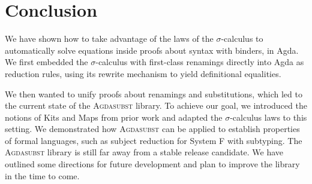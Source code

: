 \documentclass[screen,nonacm]{acmart}
\begin{document}
\section{Conclusion}\label{sec:con}
We have shown how to take advantage of the laws of the $\sigma$-calculus to
automatically solve equations inside proofs about syntax with binders, in Agda. 
We first embedded the $\sigma$-calculus with
first-class renamings directly into Agda as reduction rules, using its rewrite
mechanism to yield definitional equalities.

We then wanted to unify proofs about renamings and substitutions, which led to
the current state of the \textsc{Agdasubst} library. To achieve our goal, we
introduced the notions of Kits and Maps from prior work and adapted the
$\sigma$-calculus laws to this setting. We demonstrated how \textsc{Agdasubst}
can be applied to establish properties of formal languages, such as subject
reduction for System F with subtyping. The \textsc{Agdasubst} library is still
far away from a stable release candidate. We have outlined some directions for
future development and plan to improve the library in the time to come.



\end{document}
